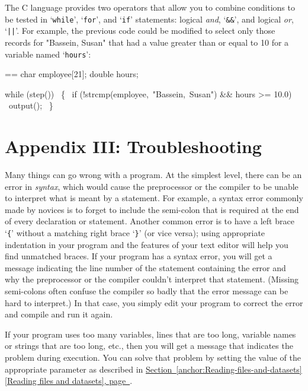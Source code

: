 \documentclass{book}
\makeatletter
\newenvironment{Texinfopreformatted}{%
  \par\GNUTobeylines\obeyspaces\frenchspacing\parskip=\z@\parindent=\z@}{}
{\catcode`\^^M=13 \gdef\GNUTobeylines{\catcode`\^^M=13 \def^^M{\null\par}}}
\newenvironment{Texinfoindented}{\begin{list}{}{}\item\relax}{\end{list}}
\renewcommand{\_}{\Texinfounderscore\discretionary{}{}{}}
\makeatother
\begin{document}
The C language provides two operators that allow you to combine conditions
to be tested in `\texttt{while}', `\texttt{for}', and `\texttt{if}' statements:
logical \textsl{and}, `\texttt{\&\&}', and logical \textsl{or}, `\texttt{||}'.
For example, the previous code could be modified to select only those
records for "Bassein, Susan" that had a value greater than or
equal to 10 for a variable named `\texttt{hours}':

\begin{Texinfoindented}
\begin{Texinfopreformatted}%
\ttfamily char employee[21];
double hours;

while (step())
\  \{
\    if (!strcmp(employee,\ "Bassein,\ Susan") \&\& hours >= 10.0)
\      output();
\  \}
\end{Texinfopreformatted}
\end{Texinfoindented}

\chapter*{{Appendix III: Troubleshooting}}
\label{anchor:Appendix-III}%
%
%

Many things can go wrong with a program.
At the simplest level, there can be an error in \textsl{syntax},
%
which would cause the preprocessor or the compiler to be unable
to interpret what is meant by a statement.
For example, a syntax error commonly made by novices is to
forget to include the semi-colon
%
that is required at the end
of every declaration or statement.
Another common error is to have a left brace `\texttt{\{}' without a
matching right brace `\texttt{\}}' (or vice versa);
using appropriate indentation in your program and the features
of your text editor will help you find
unmatched braces.
If your program has a syntax error,
you will get a message indicating the line number
of the statement containing
the error and why the preprocessor or the compiler
couldn't interpret that statement.
(Missing semi-colons often confuse the compiler so badly
that the error message can be hard to interpret.)
In that case, you simply edit your program to correct the error
and compile and run it again.

If your program uses too many variables, lines that are too long, 
variable names or strings that are too long, etc., then you will
get a message that indicates the problem during execution.
You can solve that problem by setting the value of the appropriate
parameter
%
as described in \hyperref[anchor:Reading-files-and-datasets]{Section~\ref*{anchor:Reading-files-and-datasets} [Reading files and datasets], page~\pageref*{anchor:Reading-files-and-datasets}}.
\end{document}
